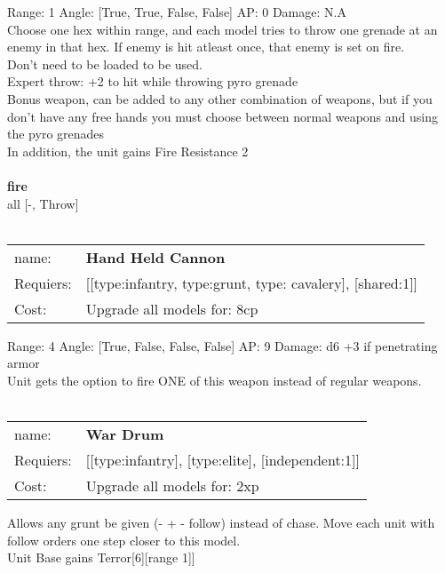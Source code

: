 Range: 1  Angle: [True, True, False, False] AP: 0 Damage: N.A \\
Choose one hex within range, and each model tries to throw one grenade at an enemy in that hex. If enemy is hit atleast once, that enemy is set on fire.\\ 
Don't need to be loaded to be used.\\ 
Expert throw: +2 to hit while throwing pyro grenade\\ 
Bonus weapon, can be added to any other combination of weapons, but if you don't have any free hands you must choose between normal weapons and using the pyro grenades\\ 
In addition, the unit gains Fire Resistance 2\\ 







\ \\ {\bf fire } \\
all [-, Throw] \\

\ \\
\begin{tabular}{ll}
name: & {\bf Hand Held Cannon } \\
Requiers: & [[type:infantry, type:grunt, type: cavalery], [shared:1]] \\
Cost: & Upgrade all models for: 8cp \\
\end{tabular}



Range: 4  Angle: [True, False, False, False] AP: 9 Damage: d6 +3 if penetrating armor \\
Unit gets the option to fire ONE of this weapon instead of regular weapons.\\ 








\ \\
\begin{tabular}{ll}
name: & {\bf War Drum } \\
Requiers: & [[type:infantry], [type:elite], [independent:1]] \\
Cost: & Upgrade all models for: 2xp \\
\end{tabular}

Allows any grunt be given (- + - follow) instead of chase. Move each unit with follow orders one step closer to this model.\\ 
Unit Base gains Terror[6][range 1]]\\ 









